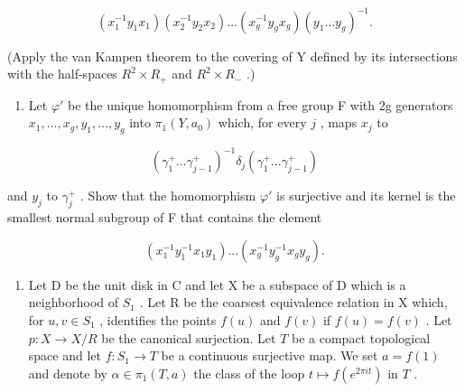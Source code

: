 \[
(x _ {1} ^ {- 1} y _ {1} x _ {1}) (x _ {2} ^ {- 1} y _ {2} x _ {2}) \dots (x _ {g} ^ {- 1} y _ {g} x _ {g}) (y _ {1} \dots y _ {g}) ^ {- 1}.
\]

(Apply the van Kampen theorem to the covering of Y defined by its intersections with the half-spaces \(R^{2} \times R_{+}\) and \(R^{2} \times R_{-}\) .)

\begin{enumerate}
\def\labelenumi{\alph{enumi})}
\setcounter{enumi}{4}
\tightlist
\item
  Let \(\varphi'\) be the unique homomorphism from a free group F with 2g generators \(x_1, \ldots, x_g, y_1, \ldots, y_g\) into \(\pi_1(Y, a_0)\) which, for every \(j\) , maps \(x_j\) to
\end{enumerate}

\[
(\gamma_ {1} ^ {+} \dots \gamma_ {j - 1} ^ {+}) ^ {- 1} \delta_ {j} (\gamma_ {1} ^ {+} \dots \gamma_ {j - 1} ^ {+})
\]

 and \(y_{j}\) to \(\gamma_{j}^{+}\) . Show that the homomorphism \(\varphi'\) is surjective and its kernel is the smallest normal subgroup of F that contains the element

\[
\left(x _ {1} ^ {- 1} y _ {1} ^ {- 1} x _ {1} y _ {1}\right) \dots \left(x _ {g} ^ {- 1} y _ {g} ^ {- 1} x _ {g} y _ {g}\right).
\]

\begin{enumerate}
\def\labelenumi{\arabic{enumi})}
\setcounter{enumi}{26}
\tightlist
\item
  Let D be the unit disk in C and let X be a subspace of D which is a neighborhood of \(S_{1}\) . Let R be the coarsest equivalence relation in X which, for \(u, v \in S_{1}\) , identifies the points \(f(u)\) and \(f(v)\) if \(f(u) = f(v)\) . Let \(p\colon X \to X / R\) be the canonical surjection. Let \(T\) be a compact topological space and let \(f\colon S_1 \to T\) be a continuous surjective map. We set \(a = f(1)\) and denote by \(\alpha \in \pi_1(T, a)\) the class of the loop \(t \mapsto f(e^{2\pi it})\) in \(T\) .
\end{enumerate}


